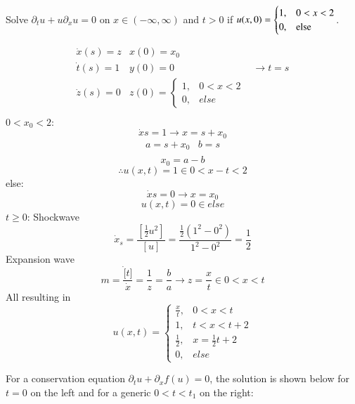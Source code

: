 \documentclass[12pt]{exam}
\newcommand{\px}{\partial_x}
\newcommand{\pt}{\partial_t}
\begin{document}
\newpage 
\begin{questions}
\begin{question}
Solve $\pt u + u \px u = 0$ on $x\in (-\infty,\infty)$ and $t>0$ if 
$u(x,0) = \begin{cases}1, & 0<x<2\\ 0, & \textnormal{else}\end{cases}$.
\end{question}
\begin{solutionorbox}[\stretch{1}]
\[
\begin{matrix}
  \Dot{x}(s) = z & x(0) = x_0 &\\
  \Dot{t}(s) = 1 & y(0) = 0 &\rightarrow t = s \\
  \Dot{z}(s) = 0 & z(0) = \begin{cases} 1, & 0<x<2\\ 0,& else
  \end{cases} &\\
\end{matrix}
\]
$0<x_0<2$:
\[\Dot{x}{s} = 1\rightarrow x = s+x_0\]
\[
\begin{matrix}
  a = s + x_0 & b = s\\
\end{matrix}
\]
\[x_0 = a-b\]
\[\therefore u(x,t) = 1 \in 0<x-t<2\]
else:
\[\Dot{x}{s} = 0\rightarrow x = x_0\]
\[u(x,t) = 0 \in else\]
$t\geq 0$:
Shockwave
\[\Dot{x}_s = \frac{\left[\frac{1}{2}u^2\right]}{[u]} = \frac{\frac{1}{2}(1^2-0^2)}{1^2-0^2}=\frac{1}{2}\]
Expansion wave
\[m = \frac{\Dot[t]}{\Dot{x}} = \frac{1}{z} = \frac{b}{a}\rightarrow z = \frac{x}{t} \in 0<x<t\]
All resulting in
\[u(x,t) = \begin{cases}
\frac{x}{t}, & 0<x<t\\
1, & t<x<t+2\\
\frac{1}{2} , & x = \frac{1}{2}t + 2\\
0, & else
\end{cases}\]
\end{solutionorbox}

\newpage 
\begin{question}
For a conservation equation $\pt u + \px f(u) = 0$, the solution is shown below for $t=0$ on the left and for 
a generic $0<t<t_1$ on the right: 


\end{question}
\end{questions}
\end{document}
